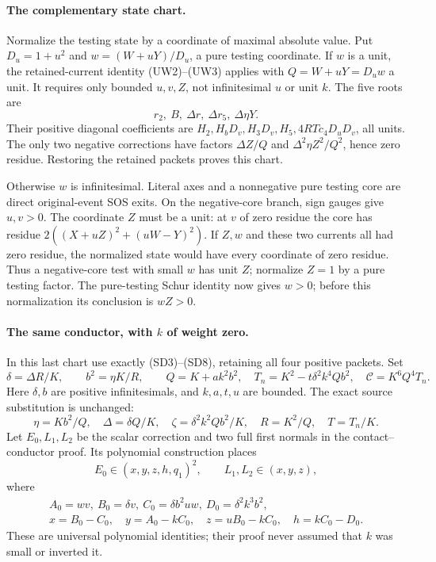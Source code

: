 \paragraph{The complementary state chart.}
Normalize the testing state by a coordinate of maximal absolute value.
Put $D_u=1+u^2$ and $w=(W+uY)/D_u$, a pure testing coordinate.
If $w$ is a unit, the retained-current identity (UW2)--(UW3) applies
with $Q=W+uY=D_uw$ a unit. It requires only bounded $u,v,Z$, not
infinitesimal $u$ or unit $k$. The five roots are
\[
 r_2,\ B,\ \Delta r,\ \Delta r_5,\ \Delta\eta Y.
\]
Their positive diagonal coefficients are
$H_2,H_bD_v,H_3D_v,H_5,4RTc_4D_uD_v$, all units.
The only two negative corrections have factors
$\Delta Z/Q$ and $\Delta^2\eta Z^2/Q^2$, hence zero residue.
Restoring the retained packets proves this chart.

Otherwise $w$ is infinitesimal. Literal axes and a nonnegative pure
testing core are direct original-event SOS exits. On the negative-core
branch, sign gauges give $u,v>0$. The coordinate $Z$ must be a unit:
at $v$ of zero residue the
core has residue $2((X+uZ)^2+(uW-Y)^2)$. If $Z,w$ and these two
currents all had zero residue, the normalized state would have every
coordinate of zero residue. Thus a negative-core test with small $w$
has unit $Z$; normalize $Z=1$ by a pure testing factor. The
pure-testing Schur identity now gives $w>0$; before this normalization
its conclusion is $wZ>0$.

\paragraph{The same conductor, with $k$ of weight zero.}
In this last chart use exactly (SD3)--(SD8), retaining all four
positive packets. Set
\[
 \delta=\Delta R/K,\qquad b^2=\eta K/R,
 \qquad Q=K+ak^2b^2,\quad T_n=K^2-t\delta^2k^4Qb^2,
 \quad\mathcal C=K^6Q^4T_n.
\]
Here $\delta,b$ are positive infinitesimals, and $k,a,t,u$ are bounded.
The exact source substitution is unchanged:
\[
 \eta=Kb^2/Q,\quad\Delta=\delta Q/K,\quad
 \zeta=\delta^2k^2Qb^2/K,\quad R=K^2/Q,\quad T=T_n/K.
\]
Let $E_0,L_1,L_2$ be the scalar correction and two full first normals
in the contact--conductor proof. Its polynomial construction places
\[
 E_0\in(x,y,z,h,q_1)^2,\qquad L_1,L_2\in(x,y,z),
 \tag{AS9}
\]
where
\[
 \begin{gathered}
 A_0=wv,\ B_0=\delta v,\ C_0=\delta b^2uw,\ D_0=\delta^2k^3b^2,\\
 x=B_0-C_0,\quad y=A_0-kC_0,\quad z=uB_0-kC_0,\quad h=kC_0-D_0.
 \end{gathered}
\]
These are universal polynomial identities; their proof never assumed
that $k$ was small or inverted it.

